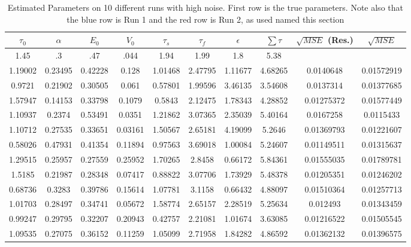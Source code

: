 \begin{table}[t]
\centering
\begin{tabular}{|c | c | c | c | c | c | c | c | c | c |}
\hline 
$\tau_0$ & $\alpha$ & $E_0$    & $V_0$    & $\tau_s$ & $\tau_f$ & $\epsilon$  & $ \sum \tau $ & $\sqrt{MSE}$ (Res.) & $\sqrt{MSE}$\\
\hline 
\rowcolor[gray]{.8}
1.45 & .3 & .47 & .044 & 1.94 & 1.99 & 1.8  & 5.38 &  & \\
\hline 
\hline 
1.19002 & 0.23495 & 0.42228 & 0.128 & 1.01468 & 2.47795 & 1.11677 & 4.68265   &0.0140648  &0.01572919   \\
0.9721 & 0.21902 & 0.30505 & 0.061 & 0.57801 & 1.99596 & 3.46135 & 3.54608    &0.0137314  &0.01377685   \\
1.57947 & 0.14153 & 0.33798 & 0.1079 & 0.5843 & 2.12475 & 1.78343 & 4.28852   &0.01275372 &0.01577449   \\
1.10937 & 0.2374 & 0.53491 & 0.0351 & 1.21862 & 3.07365 & 2.35039 & 5.40164   &0.0167258  &0.0115433    \\
1.10712 & 0.27535 & 0.33651 & 0.03161 & 1.50567 & 2.65181 & 4.19099 & 5.2646  &0.01369793 &0.01221607   \\
0.58026 & 0.47931 & 0.41354 & 0.11894 & 0.97563 & 3.69018 & 1.00084 & 5.24607 &0.01149511 &0.01315637   \\
\rowcolor[rgb]{.9,.5,.5}
1.29515 & 0.25957 & 0.27559 & 0.25952 & 1.70265 & 2.8458 & 0.66172 & 5.84361  &0.01555035 &0.01789781   \\
\rowcolor[rgb]{.5,.5,.9}
1.5185 & 0.21987 & 0.28348 & 0.07417 & 0.88822 & 3.07706 & 1.73929 & 5.48378  &0.01205351 &0.01246202   \\
0.68736 & 0.3283 & 0.39786 & 0.15614 & 1.07781 & 3.1158 & 0.66432 & 4.88097   &0.01510364 &0.01257713   \\
1.01703 & 0.28497 & 0.34741 & 0.05672 & 1.58774 & 2.65157 & 2.28519 & 5.25634 &0.012493   &0.01343459   \\
0.99247 & 0.29795 & 0.32207 & 0.20943 & 0.42757 & 2.21081 & 1.01674 & 3.63085 &0.01216522 &0.01505545   \\
\hline                                                                          
1.09535 & 0.27075 & 0.36152 & 0.11259 & 1.05099 & 2.71958 & 1.84282 & 4.86592 &0.01362132  &0.01396575\\
\hline 
\end{tabular}
\caption{Estimated Parameters on 10 different runs with high noise. First row is the true parameters.
Note also that the blue row is Run 1 and the red row is Run 2, as used named this section}
\label{tab:HighNoiseResults} 
\end{table}

